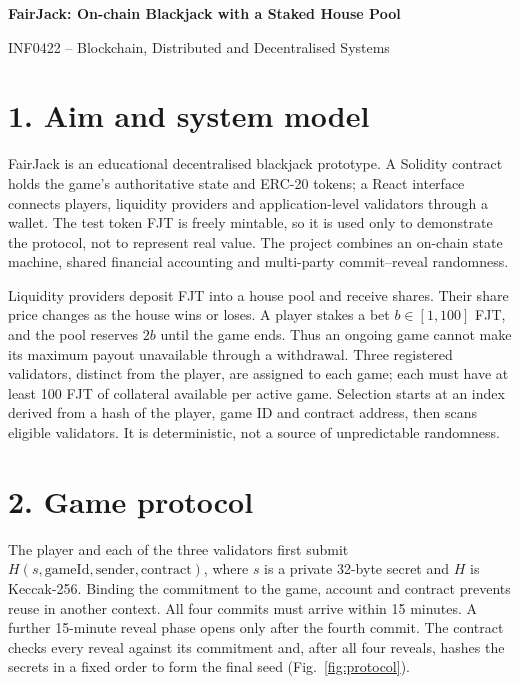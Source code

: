 \documentclass[10pt,a4paper]{article}
\newcommand{\ReportAuthors}{[Name Surname; Name Surname]}
\begin{document}
\begin{center}
  {\Large\bfseries FairJack: On-chain Blackjack with a Staked House Pool\par}
  \vspace{3pt}
  {\small INF0422 -- Blockchain, Distributed and Decentralised Systems\\
  \ReportAuthors}
\end{center}

\section*{1. Aim and system model}
FairJack is an educational decentralised blackjack prototype. A Solidity
contract holds the game's authoritative state and ERC-20 tokens; a React
interface connects players, liquidity providers and application-level
validators through a wallet. The test token FJT is freely mintable, so it is
used only to demonstrate the protocol, not to represent real value. The
project combines an on-chain state machine, shared financial accounting and
multi-party commit--reveal randomness.

Liquidity providers deposit FJT into a house pool and receive shares. Their
share price changes as the house wins or loses. A player stakes a bet
$b\in[1,100]$ FJT, and the pool reserves $2b$ until the game ends. Thus an
ongoing game cannot make its maximum payout unavailable through a withdrawal.
Three registered validators, distinct from the player, are assigned to each
game; each must have at least 100 FJT of collateral available per active
game. Selection starts at an index derived from a hash of the player, game ID
and contract address, then scans eligible validators. It is deterministic,
not a source of unpredictable randomness.

\section*{2. Game protocol}
The player and each of the three validators first submit
$H(s,\mathrm{gameId},\mathrm{sender},\mathrm{contract})$, where $s$ is a private
32-byte secret and $H$ is Keccak-256. Binding the commitment to the game,
account and contract prevents reuse in another context. All four commits
must arrive within 15 minutes. A further 15-minute reveal phase opens only
after the fourth commit. The contract checks every reveal against its
commitment and, after all four reveals, hashes the secrets in a fixed order
to form the final seed (Fig.~\ref{fig:protocol}).
\end{document}
